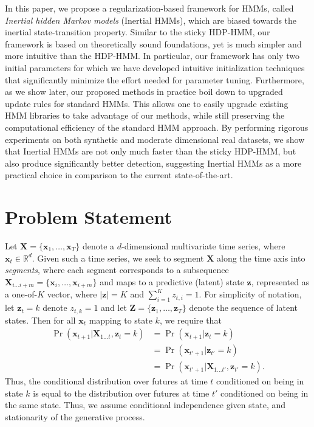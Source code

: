 \documentclass[letterpaper]{article}
\begin{document}
In this paper, we propose a regularization-based framework for HMMs, called
\emph{Inertial hidden Markov models} (Inertial HMMs), which are biased towards the inertial 
state-transition property. Similar to the sticky HDP-HMM, our framework is based on 
theoretically sound foundations, yet is much simpler and more intuitive than the HDP-HMM. 
In particular, our framework has only two initial parameters for which we have 
developed intuitive initialization techniques that significantly minimize the effort 
needed for parameter tuning. Furthermore, as we show later, our proposed
methods in practice boil down to upgraded update rules for standard HMMs. This allows one to easily 
upgrade existing HMM libraries to take advantage of our methods, while still preserving the
computational efficiency of the standard HMM approach. By performing rigorous
experiments on both synthetic and moderate dimensional real datasets, we show
that Inertial HMMs are not only much faster than the sticky HDP-HMM, but also produce 
significantly better detection, suggesting Inertial HMMs as a more practical 
choice in comparison to the current state-of-the-art.

\section{Problem Statement}

Let $\mathbf{X} = \{\mathbf{x}_1, \ldots, \mathbf{x}_T\}$ denote a
$d$-dimensional multivariate time series, where $\mathbf{x}_t \in \mathbb{R}^d$.
Given such a time series, we seek to segment $\mathbf{X}$ along the time axis
into \emph{segments}, where each segment corresponds to a subsequence
$\mathbf{X}_{i\ldots i+m} = \{\mathbf{x}_i, \ldots, \mathbf{x}_{i+m}\}$ and maps
to a predictive (latent) state $\mathbf{z}$, represented as a one-of-$K$ vector,
where $|\mathbf{z}| = K$ and $\sum_{i=1}^{K}z_{t,i} = 1$. For simplicity of
notation, let $\mathbf{z}_{t} = k$ denote $z_{t,k} = 1$ and let $\mathbf{Z} =
\{\mathbf{z}_1, \ldots, \mathbf{z}_T\}$ denote the sequence of latent states.
Then for all $\mathbf{x}_{t}$ mapping to state $k$, we require that
\begin{align*}
    \Pr(\mathbf{x}_{t+1}|\mathbf{X}_{1\ldots t}, \mathbf{z}_t = k) 
    &= \Pr(\mathbf{x}_{t+1}| \mathbf{z}_t = k) \\
    &= \Pr(\mathbf{x}_{t'+1}| \mathbf{z}_{t'} = k) \\
    &= \Pr(\mathbf{x}_{t'+1}| \mathbf{X}_{1\ldots t'}, \mathbf{z}_{t'} = k).
\end{align*}
Thus, the conditional distribution over futures at time $t$ conditioned on being
in state $k$ is equal to the distribution over futures at time $t'$ conditioned
on being in the same state. Thus, we assume conditional independence given
state, and stationarity of the generative process.
\end{document}
